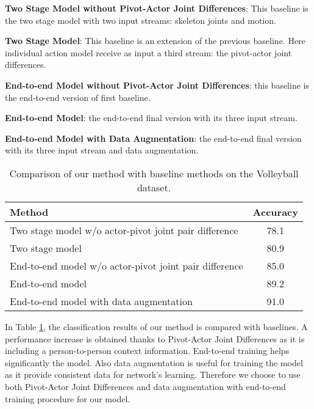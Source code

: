 \documentclass[a4paper,conference]{IEEEtran}
\begin{document}

\setcounter{elenco}{0}
\begin{list}{}{\setlength{\itemsep}{0.3cm}}
\item \textbf{Two Stage Model without Pivot-Actor Joint Differences}: This baseline is the two stage model with two input streams: skeleton joints and motion. 
\item \textbf{Two Stage Model}: This baseline is an extension of the previous baseline. Here individual action model receive as input a third stream: the pivot-actor joint differences. 
\item \textbf{End-to-end Model without Pivot-Actor Joint Differences}: this baseline is the end-to-end version of first baseline. 
\item \textbf{End-to-end Model}: the end-to-end final version with its three input stream. 
\item \textbf{End-to-end Model with Data Augmentation}: the end-to-end final version with its three input stream and data augmentation.
\end{list}


\begin{table}
    \centering
    \begin{tabular}{l  c } 
    \hline
    Method & Accuracy  \\ [0.5ex] 
    \hline
    Two stage model w/o actor-pivot joint pair difference & 78.1 \\ 
    
    Two stage model & 80.9 \\
    
    End-to-end model w/o actor-pivot joint pair difference & 85.0 \\
    
     End-to-end model & 89.2  \\
    
     End-to-end model with data augmentation & 91.0 \\ 
    \hline
    \end{tabular}
    
\caption{Comparison of our method with baseline methods on the Volleyball dataset.}
\label{tab:baselines}
\end{table}


In Table \ref{tab:baselines}, the classification results of our method is compared with baselines. A performance increase is obtained thanks to Pivot-Actor Joint Differences as it is including a person-to-person context information. End-to-end training helps significantly the model. Also data augmentation is useful for training the model as it provide consistent data for network's learning. Therefore we choose to use both Pivot-Actor Joint Differences and data augmentation with end-to-end training procedure for our model.
\end{document}
